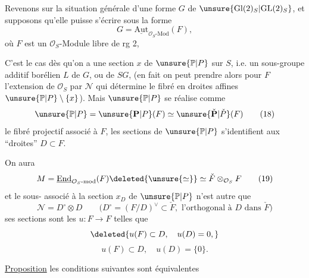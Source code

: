 

Revenons sur la situation générale d'une forme $G$ de $\unsure{\mathrm{Gl}(2)_S|\mathrm{GL}(2)_S}$, et supposons qu'elle puisse s'écrire sous la forme
\[
G=\underline{\mathrm{Aut}}_{\mathcal O_S\text{-Mod}}(F), \tag{17}
\]
où $F$ est un $\mathcal O_S$-Module  libre de rg 2,

C'est le cas dès qu'on a une section $x$ de $\unsure{\mathbb P|P}$ sur $S$, i.e. un sous-groupe additif borélien $L$ de $G$, ou de $SG$, (en fait on peut prendre alors pour $F$ l'extension de $\mathcal O_S$ par $\mathcal N$ qui détermine le fibré en droites affines $\unsure{\mathbb P|P}\setminus\{x\}$). Mais  $\unsure{\mathbb P|P}$ se réalise comme 
\[
\unsure{\mathbb P|P}=\unsure{\mathbf P|P}(F)\simeq\unsure{\check{\mathbf P}|\check P}(F) \tag{18}
\]
le fibré projectif associé à $F$,   les sections de $\unsure{\mathbb P|P}$ s'identifient aux ``droites'' $D\subset F$.

On aura
\[
M=\underline{\mathrm{End}}_{\mathcal O_S\text{-mod}}(F)\deleted{\unsure{\simeq}}\simeq\check F\otimes_{\mathcal O_S}F \tag{19}
\]
et le sous-  associé à la section $x_D$ de $\unsure{\mathbb P|P}$  n'est autre que 
\[
\mathcal N=D^\circ\otimes D
\qquad\bigl(D^\circ=(F/D)^\vee\subset\check F,\text{ l'orthogonal à }D\text{ dans }\check F\bigr) \tag{20}
\]
ses sections sont les $u:F\longrightarrow F$ telles que
\[
\deleted{u(F)\subset D,\quad u(D)=0,}
\]
\[
u(F)\subset D,\quad u(D)=\{0\}. \tag{21}
\]


\uline{Proposition}   les conditions suivantes sont équivalentes

